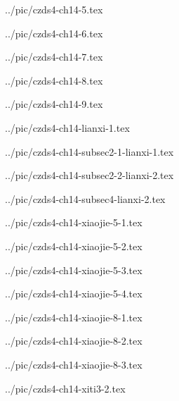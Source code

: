 ../pic/czds4-ch14-5.tex



../pic/czds4-ch14-6.tex



../pic/czds4-ch14-7.tex



../pic/czds4-ch14-8.tex



../pic/czds4-ch14-9.tex



../pic/czds4-ch14-lianxi-1.tex



../pic/czds4-ch14-subsec2-1-lianxi-1.tex



../pic/czds4-ch14-subsec2-2-lianxi-2.tex



../pic/czds4-ch14-subsec4-lianxi-2.tex



../pic/czds4-ch14-xiaojie-5-1.tex



../pic/czds4-ch14-xiaojie-5-2.tex



../pic/czds4-ch14-xiaojie-5-3.tex



../pic/czds4-ch14-xiaojie-5-4.tex



../pic/czds4-ch14-xiaojie-8-1.tex



../pic/czds4-ch14-xiaojie-8-2.tex



../pic/czds4-ch14-xiaojie-8-3.tex



../pic/czds4-ch14-xiti3-2.tex



